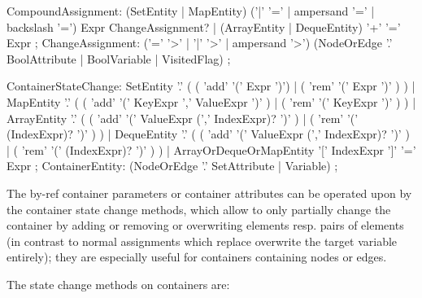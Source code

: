 \begin{rail}
  CompoundAssignment:
    (SetEntity | MapEntity) ('|' '=' | ampersand '=' | backslash '=') Expr ChangeAssignment? |
    (ArrayEntity | DequeEntity) '+' '=' Expr
  ;
  ChangeAssignment:
    ('=' '>' | '|' '>' | ampersand '>') (NodeOrEdge '.' BoolAttribute | BoolVariable | VisitedFlag)
  ;
\end{rail}

\begin{rail}
  ContainerStateChange:
   	SetEntity '.' ( ( 'add' '(' Expr ')') | ( 'rem' '(' Expr ')' ) ) |
	  MapEntity '.' ( ( 'add' '(' KeyExpr ',' ValueExpr ')' ) | ( 'rem' '(' KeyExpr ')' ) ) |
	  ArrayEntity '.' ( ( 'add' '(' ValueExpr (','  IndexExpr)? ')' ) | ( 'rem' '(' (IndexExpr)? ')' ) ) |
	  DequeEntity '.' ( ( 'add' '(' ValueExpr (','  IndexExpr)? ')' ) | ( 'rem' '(' (IndexExpr)? ')' ) ) |
	  ArrayOrDequeOrMapEntity '[' IndexExpr ']' '=' Expr
	;
	ContainerEntity:
	  (NodeOrEdge '.' SetAttribute | Variable)
	;
\end{rail}

The by-ref container parameters or container attributes can be operated upon by the container state change methods,
which allow to only partially change the container by adding or removing or overwriting elements resp. pairs of elements (in contrast to normal assignments which replace overwrite the target variable entirely);
they are especially useful for containers containing nodes or edges.

\noindent The state change methods on containers are:

